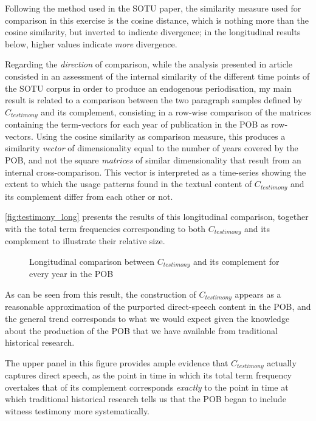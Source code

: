 Following the method used in the SOTU paper, the similarity measure used for comparison in this exercise is the cosine distance, which is nothing more than the cosine similarity, but inverted to indicate divergence; in the longitudinal results below, higher values indicate \emph{more} divergence.

Regarding the \emph{direction} of comparison, while the analysis presented in \citeauthor['s]{rule2015} article consisted in an assessment of the internal similarity of the different time points of the SOTU corpus in order to produce an endogenous periodisation, my main result is related to a comparison between the two paragraph samples defined by $C_{testimony}$ and its complement, consisting in a row-wise comparison of the matrices containing the term-vectors for each year of publication in the POB as row-vectors.
Using the cosine similarity as comparison measure, this produces a similarity \emph{vector} of dimensionality equal to the number of years covered by the POB, and not the square \emph{matrices} of similar dimensionality that result from an internal cross-comparison.
This vector is interpreted as a time-series showing the extent to which the usage patterns found in the textual content of $C_{testimony}$ and its complement differ from each other or not.

\autoref{fig:testimony_long} presents the results of this longitudinal comparison, together with the total term frequencies corresponding to both $C_{testimony}$ and its complement to illustrate their relative size.

\begin{figure}
    \centerfloat
    
    \caption[$C_{testiomony}$ and its complement]{
        Longitudinal comparison between $C_{testimony}$ and its complement for every year in the POB
    }
    \label{fig:testimony_long}
\end{figure}

As can be seen from this result, the construction of $C_{testimony}$ appears as a reasonable approximation of the purported direct-speech content in the POB, and the general trend corresponds to what we would expect given the knowledge about the production of the POB that we have available from traditional historical research.

The upper panel in this figure provides ample evidence that $C_{testimony}$ actually captures direct speech, as the point in time in which its total term frequency overtakes that of its complement corresponds \emph{exactly} to the point in time at which traditional historical research tells us that the POB began to include witness testimony more systematically.

